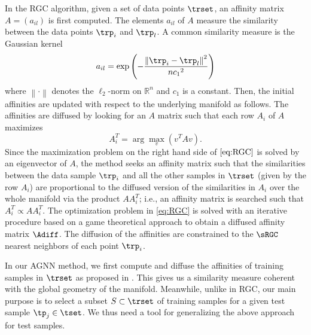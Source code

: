 \documentclass[journal]{IEEEtran}
\begin{document}
In the RGC algorithm, given a set of data points $\trset$, an affinity matrix $A=(a_{il})$ is first computed. The elements $a_{il}$ of $A$ measure the similarity between the data points $\trp_i$ and $\trp_l$. A common similarity measure is the Gaussian kernel 
%
\begin{equation}
\label{eq:defn_aff_kernel}
a_{il}=\exp{\left(-\frac{\left\| \trp_{i}- \trp_{l}\right\|^2}{n{c_1}^2}\right)}
\end{equation}
%
where $\left\| \cdot \right\|$ denotes the $\ell_2$-norm on $\mathbb{R}^n$ and $c_1$ is a constant. Then, the initial affinities are updated with respect to the underlying manifold as follows. The affinities are diffused by looking for an $A$ matrix such that each row $A_i$ of $A$ maximizes 
%
\begin{equation}
\label{eq:RGC}
A_i^T = \arg \max_v (v^T A v).
\end{equation} 
%
Since the maximization problem on the right hand side of $\eqref{eq:RGC}$ is solved by an eigenvector of $A$, the method seeks an affinity matrix such that the similarities between the data sample $\trp_i$ and all the other samples in $\trset$ (given by the row $A_i$) are proportional to the diffused version of the similarities in $A_i$ over the whole manifold via the product $A A_i^T$; i.e., an affinity matrix is searched such that $A_i^T  \propto A A_i^T$. The optimization problem in \eqref{eq:RGC} is solved with an iterative procedure based on a game theoretical approach to obtain a diffused affinity matrix $\Adiff$. The diffusion of the affinities are constrained to the $\sRGC$ nearest neighbors of each point $\trp_i$.


In our AGNN method, we first compute and diffuse the affinities of training samples in $\trset$ as proposed in \cite{Donoser13replicator}. This gives us a similarity measure coherent with the global geometry of the manifold. Meanwhile, unlike in RGC, our main purpose is to select a subset $S \subset \trset$ of training samples for a given test sample $\tp_j \in \tset$. We thus need a tool for generalizing the above approach for test samples. 
\end{document}
